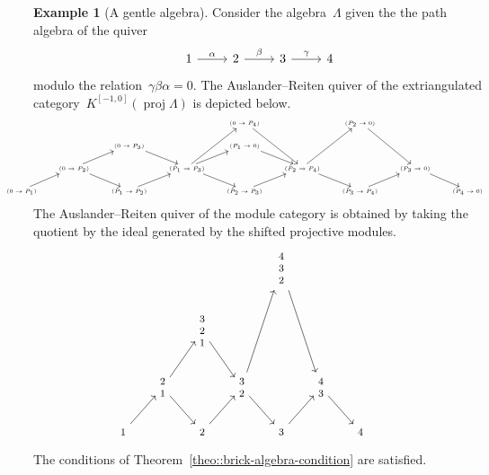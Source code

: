 \documentclass{amsart}
\theoremstyle{definition}
\newtheorem{example}[theorem]{Example}
\newcommand{\proj}{\operatorname{proj}}
\begin{document}
\begin{example}[A gentle algebra]
 Consider the algebra~$\Lambda$ given the the path algebra of the quiver
 \[
  \begin{tikzcd}
   1 \arrow[r, "\alpha"] & 2\arrow[r, "\beta"] & 3\arrow[r, "\gamma"] & 4
  \end{tikzcd}
 \]
 modulo the relation~$\gamma\beta\alpha = 0$.  The Auslander--Reiten quiver of the extriangulated category~$K^{[-1, 0]}(\proj\Lambda)$ is depicted below.
 \[
 \hspace*{-1cm}
 {\tiny
  \begin{tikzcd}
    &&&& (0\to P_4)\arrow[ddr] && (P_2\to 0)\arrow[ddr] && \\
    && (0\to P_3)\arrow[dr] && (P_1\to 0)\arrow[dr] &&&& \\
    & (0\to P_2)\arrow[dr]\arrow[ur] && (P_1\to P_3)\arrow[uur]\arrow[ur]\arrow[dr] && (P_2\to P_4)\arrow[uur]\arrow[dr] && (P_3\to 0)\arrow[dr] & \\
    (0\to P_1) \arrow[ur] && (P_1\to P_2)\arrow[ur] && (P_2\to P_3)\arrow[ur]  && (P_3\to P_4)\arrow[ur] && (P_4\to 0)
  \end{tikzcd}
 }
 \]
 The Auslander--Reiten quiver of the module category is obtained by taking the quotient by the ideal generated by the shifted projective modules.
 \[
 \hspace*{-1cm}
 {\footnotesize
  \begin{tikzcd}
    &&&& \begin{matrix} 4\\3\\2 \end{matrix}\arrow[ddr] && \\
    && \begin{matrix} 3\\2\\1 \end{matrix}\arrow[dr] &&&& \\
    & \begin{matrix} 2\\1 \end{matrix}\arrow[dr]\arrow[ur] && \begin{matrix} 3\\2 \end{matrix}\arrow[uur]\arrow[dr] && \begin{matrix} 4\\3 \end{matrix}\arrow[dr] & \\
    \begin{matrix} 1 \end{matrix} \arrow[ur] && \begin{matrix} 2 \end{matrix}\arrow[ur] && \begin{matrix} 3 \end{matrix}\arrow[ur] && \begin{matrix}4 \end{matrix}
  \end{tikzcd}
 }
 \]
 The conditions of Theorem~\ref{theo::brick-algebra-condition} are satisfied.

\end{example}
\end{document}
